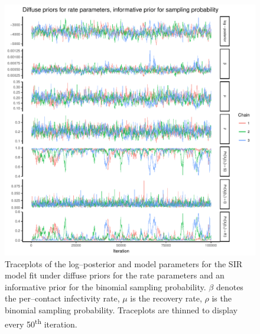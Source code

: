 \begin{figure}[htbp]
	\centering
	\includegraphics[width=0.9\linewidth]{figures/diffuse_informative_traceplots.pdf}
	\caption{Traceplots of the log--posterior and model parameters for the SIR model fit under diffuse priors for the rate parameters and an informative prior for the binomial sampling probability. $ \beta $ denotes the per--contact infectivity rate, $ \mu $ is the recovery rate, $ \rho $ is the binomial sampling probability. Traceplots are thinned to display every 50\textsuperscript{th} iteration.}
	\label{fig:diffuse_inform_traces}
\end{figure}

